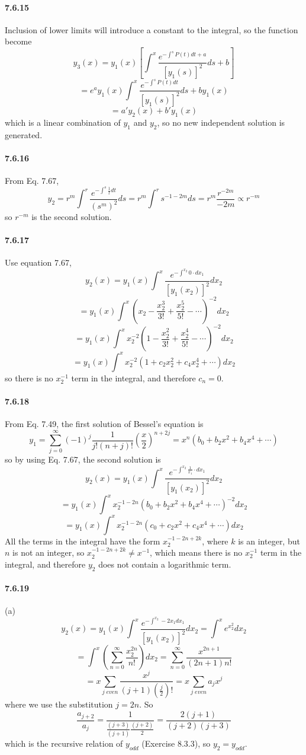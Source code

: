 \documentclass[a4paper]{article}
\begin{document}
\paragraph{7.6.15}
Inclusion of lower limits will introduce a constant to the integral, so the function become
\[
y_3(x)=y_1(x)\left[\int^x\frac{e^{-\int^sP(t)dt+a}}{[y_1(s)]^2}ds+b\right]
\]
\[
=e^ay_1(x)\int^x\frac{e^{-\int^sP(t)dt}}{[y_1(s)]^2}ds+by_1(x)
\]
\[
=a'y_2(x)+b'y_1(x)
\]
which is a linear combination of $y_1$ and $y_2$, so no new independent solution is generated.

\paragraph{7.6.16}
From Eq. 7.67,
\[
y_2=r^m\int^r\frac{e^{-\int^s\frac{1}{t}dt}}{(s^m)^2}ds=r^m\int^rs^{-1-2m}ds=r^m\frac{r^{-2m}}{-2m}\propto r^{-m}
\]
so $r^{-m}$ is the second solution.

\paragraph{7.6.17}
Use equation 7.67,
\[
y_2(x)=y_1(x)\int^x\frac{e^{-\int^{x_2}0\cdot dx_1}}{[y_1(x_2)]^2}dx_2\]
\[=y_1(x)\int^x(x_2-\frac{x_2^3}{3!}+\frac{x_2^5}{5!}-\cdots)^{-2}dx_2
\]
\[
=y_1(x)\int^xx_2^{-2}(1-\frac{x_2^2}{3!}+\frac{x_2^4}{5!}-\cdots)^{-2}dx_2
\]
\[
=y_1(x)\int^xx_2^{-2}(1+c_2x_2^2+c_4x_2^4+\cdots)dx_2
\]
so there is no $x_2^{-1}$ term in the integral, and therefore $c_n=0$.

\paragraph{7.6.18}
From Eq. 7.49, the first solution of Bessel’s equation is
\[
y_1=\sum_{j=0}^\infty(-1)^j\frac{1}{j!(n+j)!}(\frac{x}{2})^{n+2j}=x^n(b_0+b_2x^2+b_4x^4+\cdots)
\]
so by using Eq. 7.67, the second solution is
\[
y_2(x)=y_1(x)\int^x\frac{e^{-\int^{x_2}\frac{1}{x_1}\cdot dx_1}}{[y_1(x_2)]^2}dx_2\]
\[
=y_1(x)\int^xx_2^{-1-2n}(b_0+b_2x^2+b_4x^4+\cdots)^{-2}dx_2
\]
\[
=y_1(x)\int^xx_2^{-1-2n}(c_0+c_2x^2+c_4x^4+\cdots)dx_2
\]
All the terms in the integral have the form $x_2^{-1-2n+2k}$, where $k$ is an integer, but $n$ is not an integer, so $x_2^{-1-2n+2k}\neq x^{-1}$, which means there is no $x_2^{-1}$ term in the integral, and therefore $y_2$ does not contain a logarithmic term.

\paragraph{7.6.19}
(a)
\[
y_2(x)=y_1(x)\int^x\frac{e^{-\int^{x_2}-2x_1dx_1}}{[y_1(x_2)]^2}dx_2
=\int^xe^{x_2^2}dx_2\]
\[=\int^x\left(\sum_{n=0}^\infty\frac{x_2^{2n}}{n!}\right)dx_2=\sum_{n=0}^\infty\frac{x^{2n+1}}{(2n+1)n!}\]
\[=x\sum_{j\;even}\frac{x^j}{(j+1)(\frac{j}{2})!}=x\sum_{j\;even}a_jx^j
\]
where we use the substitution $j=2n$. So
\[
\frac{a_{j+2}}{a_j}=\frac{1}{\frac{(j+3)}{(j+1)}\frac{(j+2)}{2}}=\frac{2(j+1)}{(j+2)(j+3)}
\]
which is the recursive relation of $y_{odd}$ (Exercise 8.3.3), so $y_2=y_{odd}$.
\end{document}
